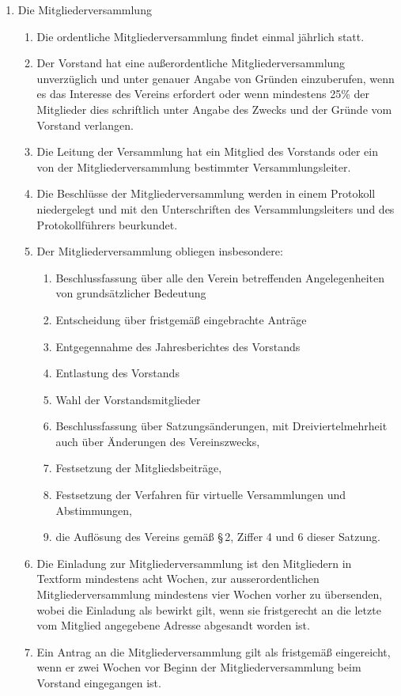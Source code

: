 \documentclass[12pt,a4paper]{article}
\begin{document}
\begin{enumerate}
\item Die Mitgliederversammlung
\begin{enumerate}
\item Die ordentliche Mitgliederversammlung findet einmal jährlich statt.
\item Der Vorstand hat eine außerordentliche Mitgliederversammlung unverzüglich und unter genauer Angabe von Gründen einzuberufen, wenn es das Interesse des Vereins erfordert oder wenn mindestens 25\% der Mitglieder dies schriftlich unter Angabe des Zwecks und der Gründe vom Vorstand verlangen.
\item Die Leitung der Versammlung hat ein Mitglied des Vorstands oder ein von der Mitgliederversammlung bestimmter Versammlungsleiter.
\item Die Beschlüsse der Mitgliederversammlung werden in einem Protokoll niedergelegt und mit den Unterschriften des Versammlungsleiters und des Protokollführers beurkundet.
\item Der Mitgliederversammlung obliegen insbesondere:
\begin{enumerate}
\item Beschlussfassung über alle den Verein betreffenden Angelegenheiten von grundsätzlicher Bedeutung
\item Entscheidung über fristgemäß eingebrachte Anträge
\item Entgegennahme des Jahresberichtes des Vorstands
\item Entlastung des Vorstands
\item Wahl der Vorstandsmitglieder
\item Beschlussfassung über Satzungsänderungen, mit Dreiviertelmehrheit auch über Änderungen des Vereinszwecks,
\item Festsetzung der Mitgliedsbeiträge,
\item Festsetzung der Verfahren für virtuelle Versammlungen und Abstimmungen, 
\item die Auflösung des Vereins gemäß §\,2, Ziffer 4 und 6 dieser Satzung.
\end{enumerate}
\item Die Einladung zur Mitgliederversammlung ist den Mitgliedern in Textform mindestens acht Wochen, zur ausserordentlichen Mitgliederversammlung mindestens vier Wochen vorher zu übersenden, wobei die Einladung als bewirkt gilt, wenn sie fristgerecht an die letzte vom Mitglied angegebene Adresse abgesandt worden ist.
\item Ein Antrag an die Mitgliederversammlung gilt als fristgemäß eingereicht, wenn er zwei Wochen vor Beginn der Mitgliederversammlung beim Vorstand eingegangen ist.

\end{enumerate}
\end{enumerate}
\end{document}
